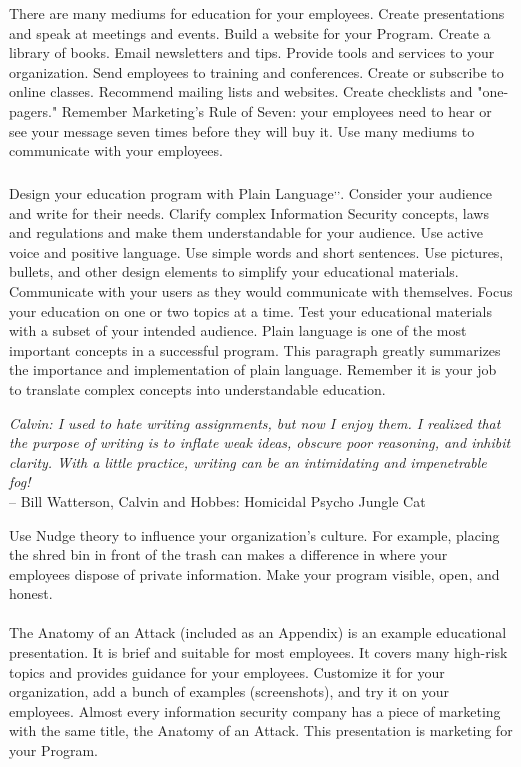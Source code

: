There are many mediums for education for your employees. Create presentations and speak at meetings and events. Build a website for your Program. Create a library of books. Email newsletters and tips. Provide tools and services to your organization. Send employees to training and conferences. Create or subscribe to online classes. Recommend mailing lists and websites. Create checklists and "one-pagers." Remember Marketing's Rule of Seven: your employees need to hear or see your message seven times before they will buy it. Use many mediums to communicate with your employees.\\\\
Design your education program with Plain Language\textsuperscript{,}\textsuperscript{,}. Consider your audience and write for their needs. Clarify complex Information Security concepts, laws and regulations and make them understandable for your audience. Use active voice and positive language. Use simple words and short sentences. Use pictures, bullets, and other design elements to simplify your educational materials. Communicate with your users as they would communicate with themselves. Focus your education on one or two topics at a time. Test your educational materials with a subset of your intended audience. Plain language is one of the most important concepts in a successful program. This paragraph greatly summarizes the importance and implementation of plain language. Remember it is your job to translate complex concepts into understandable education.\\
\begin{mdframed}
\emph{Calvin: I used to hate writing assignments, but now I enjoy them. I realized that the purpose of writing is to inflate weak ideas, obscure poor reasoning, and inhibit clarity. With a little practice, writing can be an intimidating and impenetrable fog!}\\ -- Bill Watterson, Calvin and Hobbes: Homicidal Psycho Jungle Cat
\end{mdframed}\vspace{5mm}
Use Nudge theory to influence your organization's culture. For example, placing the shred bin in front of the trash can makes a difference in where your employees dispose of private information. Make your program visible, open, and honest.\\\\
The Anatomy of an Attack (included as an Appendix) is an example educational presentation. It is brief and suitable for most employees. It covers many high-risk topics and provides guidance for your employees. Customize it for your organization, add a bunch of examples (screenshots), and try it on your employees. Almost every information security company has a piece of marketing with the same title, the Anatomy of an Attack. This presentation is marketing for your Program.\\\\
